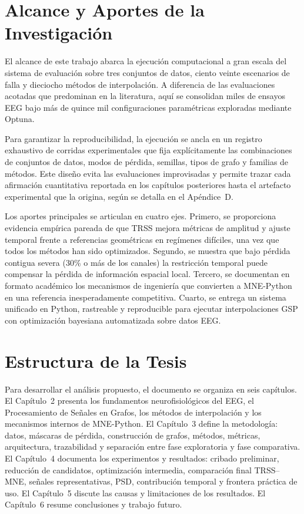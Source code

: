 \section{Alcance y Aportes de la Investigación}

El alcance de este trabajo abarca la ejecución computacional a gran escala del sistema de evaluación sobre tres conjuntos de datos, ciento veinte escenarios de falla y dieciocho métodos de interpolación. A diferencia de las evaluaciones acotadas que predominan en la literatura, aquí se consolidan miles de ensayos EEG bajo más de quince mil configuraciones paramétricas exploradas mediante Optuna.

Para garantizar la reproducibilidad, la ejecución se ancla en un registro exhaustivo de corridas experimentales que fija explícitamente las combinaciones de conjuntos de datos, modos de pérdida, semillas, tipos de grafo y familias de métodos. Este diseño evita las evaluaciones improvisadas y permite trazar cada afirmación cuantitativa reportada en los capítulos posteriores hasta el artefacto experimental que la origina, según se detalla en el Apéndice~D.

Los aportes principales se articulan en cuatro ejes. Primero, se proporciona evidencia empírica pareada de que TRSS mejora métricas de amplitud y ajuste temporal frente a referencias geométricas en regímenes difíciles, una vez que todos los métodos han sido optimizados. Segundo, se muestra que bajo pérdida contigua severa (30\% o más de los canales) la restricción temporal puede compensar la pérdida de información espacial local. Tercero, se documentan en formato académico los mecanismos de ingeniería que convierten a MNE-Python en una referencia inesperadamente competitiva. Cuarto, se entrega un sistema unificado en Python, rastreable y reproducible para ejecutar interpolaciones GSP con optimización bayesiana automatizada sobre datos EEG.

\section{Estructura de la Tesis}

Para desarrollar el análisis propuesto, el documento se organiza en seis capítulos. El Capítulo~2 presenta los fundamentos neurofisiológicos del EEG, el Procesamiento de Señales en Grafos, los métodos de interpolación y los mecanismos internos de MNE-Python. El Capítulo~3 define la metodología: datos, máscaras de pérdida, construcción de grafos, métodos, métricas, arquitectura, trazabilidad y separación entre fase exploratoria y fase comparativa. El Capítulo~4 documenta los experimentos y resultados: cribado preliminar, reducción de candidatos, optimización intermedia, comparación final TRSS--MNE, señales representativas, PSD, contribución temporal y frontera práctica de uso. El Capítulo~5 discute las causas y limitaciones de los resultados. El Capítulo~6 resume conclusiones y trabajo futuro.

